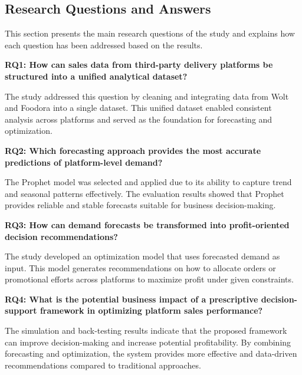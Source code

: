 \subsection{Research Questions and Answers}

This section presents the main research questions of the study and explains how each question has been addressed based on the results.

\textbf{RQ1: How can sales data from third-party delivery platforms be structured into a unified analytical dataset?}

The study addressed this question by cleaning and integrating data from Wolt and Foodora into a single dataset. This unified dataset enabled consistent analysis across platforms and served as the foundation for forecasting and optimization.

\textbf{RQ2: Which forecasting approach provides the most accurate predictions of platform-level demand?}

The Prophet model was selected and applied due to its ability to capture trend and seasonal patterns effectively. The evaluation results showed that Prophet provides reliable and stable forecasts suitable for business decision-making.

\textbf{RQ3: How can demand forecasts be transformed into profit-oriented decision recommendations?}

The study developed an optimization model that uses forecasted demand as input. This model generates recommendations on how to allocate orders or promotional efforts across platforms to maximize profit under given constraints.

\textbf{RQ4: What is the potential business impact of a prescriptive decision-support framework in optimizing platform sales performance?}

The simulation and back-testing results indicate that the proposed framework can improve decision-making and increase potential profitability. By combining forecasting and optimization, the system provides more effective and data-driven recommendations compared to traditional approaches.